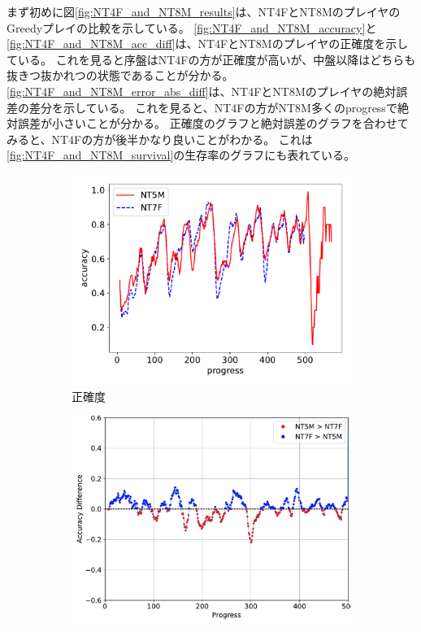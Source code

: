 まず初めに図\ref{fig:NT4F_and_NT8M_results}は、NT4FとNT8MのプレイヤのGreedyプレイの比較を示している。
\ref{fig:NT4F_and_NT8M_accuracy}と\ref{fig:NT4F_and_NT8M_acc_diff}は、NT4FとNT8Mのプレイヤの正確度を示している。
これを見ると序盤はNT4Fの方が正確度が高いが、中盤以降はどちらも抜きつ抜かれつの状態であることが分かる。
\ref{fig:NT4F_and_NT8M_error_abs_diff}は、NT4FとNT8Mのプレイヤの絶対誤差の差分を示している。
これを見ると、NT4Fの方がNT8M多くのprogressで絶対誤差が小さいことが分かる。
正確度のグラフと絶対誤差のグラフを合わせてみると、NT4Fの方が後半かなり良いことがわかる。
これは\ref{fig:NT4F_and_NT8M_survival}の生存率のグラフにも表れている。

\begin{figure}[t]
\centering
\begin{subfigure}[b]{0.49\linewidth}
    \includegraphics[width=\linewidth]{pdf/compare/NT5M_and_NT7F/accuracy.pdf}
    \caption{正確度}
    \label{fig:NT5M_and_NT7F_accuracy}
\end{subfigure}
\begin{subfigure}[b]{0.49\linewidth}
    \includegraphics[width=\linewidth]{pdf/compare/NT5M_and_NT7F/acc_diff_plot.pdf}

\end{subfigure}
\end{figure}
